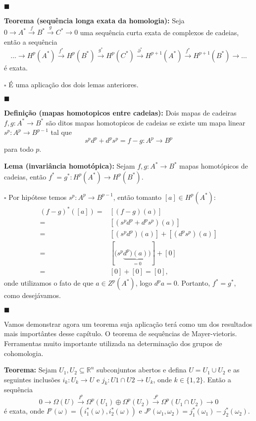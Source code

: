 \documentclass{article}
\begin{document}
	$\blacksquare$
	
	\vspace{2 mm}
	\textbf{Teorema (sequência longa exata da homologia):} Seja $0 \to A^{*} \xrightarrow{f} B^{*} \xrightarrow{g} C^{*} \to 0$ uma sequência curta exata de complexos de cadeias, então a sequência $$
	\dots \to H^{p}(A^{*}) \xrightarrow{f^{*}} H^{p}(B^{*}) \xrightarrow{g^{*}} H^{p}(C^{*}) \xrightarrow{\partial^{*}} H^{p+1}(A^{*}) \xrightarrow{f^{*}} H^{p+1}(B^{*}) \to \dots
	$$
	é exata.
	
	$\square$ É uma aplicação dos dois lemas anteriores. 
	
	$\blacksquare$
	
	\vspace{2 mm}
	\textbf{Definição (mapas homotopicos entre cadeias):} Dois mapas de cadeiras $f,g : A^{*} \to B^{*}$ são ditos mapas homotopicos de cadeias se existe um mapa linear $s^{p}: A^{p} \to B^{p-1}$ tal que
	$$
	s^{p}d^{p} + d^{p}s^{p} = f-g : A^{p} \to B^{p}
	$$
	para todo $p$.
	
	\vspace{2 mm}
	\textbf{Lema (invariância homotópica):} Sejam $f,g : A^{*} \to B^{*}$ mapas homotópicos de cadeias, então $f^{*} = g^{*}: H^{p}(A^{*}) \to H^{p}(B^{*})$.
	
	$\square$ Por hipótese temos $s^{p}: A^{p} \to B^{p-1}$, então tomanto $[a] \in H^{p}(A^{*})$:
	$$
	\begin{aligned}
	(f-g)^{*}([a]) =& [(f-g)(a)]
	\\
	=& [(s^{p}d^{p} + d^{p}s^{p})(a)]
	\\
	=& [(s^{p}d^{p})(a)] + [(d^{p}s^{p})(a)]
	\\
	=& [(s^{p} \underbrace{d^{p})(a))}_{
		=0}] +[0]
	\\
	=& [0]+[0] = [0],
	\end{aligned}
	$$ 
	onde utilizamos o fato de que $a\in Z^{p}(A^{*})$, logo $d^{p}a = 0$. Portanto, $f^{*} = g^{*}$, como desejávamos. 
	
	$\blacksquare$
	
	Vamos demonstrar agora um teorema suja aplicação terá como um dos resultados mais importântes desse capítulo. O teorema de sequências de Mayer-vietoris. Ferramentas muito importante utilizada na determinação dos grupos de cohomologia.
	
	\vspace{2 mm}
	\textbf{Teorema:} Sejam $U_{1}, U_{2} \subseteq \mathbb{R}^{n}$ subconjuntos abertos e defina $U=U_{1} \cup U_{2}$ e as seguintes inclusões $i_{k}: U_{k} \to U$ e $j_{k}: U{1}\cap U{2} \to U_{k}$, onde $k \in \{1,2\}$. Então a sequência
	$$
	0 \to \Omega(U) \xrightarrow{I^{p}} \Omega^{p}(U_{1}) \oplus \Omega^{p}(U_{2}) \xrightarrow{J^{p}} \Omega^{p}(U_{1} \cap U_{2}) \to 0 
	$$
	é exata, onde $I^{p}(\omega) = (i^{*}_{1}(\omega), i^{*}_{2}(\omega))$ e $J^{p}(\omega_{1}, \omega_{2}) = j^{*}_{1}(\omega_{1})- j^{*}_{2}(\omega_{2})$.
	
\end{document}
